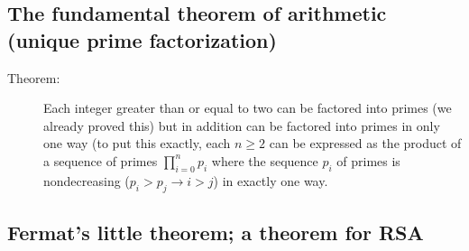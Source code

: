 \documentclass[12pt]{article}
\begin{document}
\subsection{The fundamental theorem of arithmetic (unique prime factorization)}
\begin{description}
\item[Theorem:]  Each integer greater than or equal to two can be factored into primes (we already proved this) but in addition can be factored into primes in only one way (to put this exactly, each $n \geq 2$ can be expressed as the product of a sequence of primes $\prod_{i=0}^n p_i$ where the sequence $p_i$ of primes is nondecreasing ($p_i>p_j \rightarrow i > j$) in exactly one way.
\end{description}

\subsection{Fermat's little theorem; a theorem for RSA}
\end{document}
